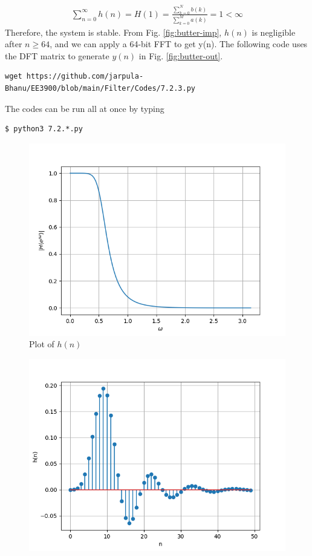 \documentclass[journal,12pt,twocolumn]{IEEEtran}
\renewcommand\thesection{\arabic{section}}
\begin{document}
\begin{enumerate}[label=\thesection.\arabic*]
\begin{align}
	\sum_{n = 0}^{\infty}h(n) = H(1) = \frac{\sum_{k = 0}^{N}b(k)}{\sum_{k = 0}^{M}a(k)} = 1 < \infty
\end{align}
Therefore, the system is stable. From
Fig. \eqref{fig:butter-imp}, $h(n)$ is negligible after $n \geq 64$, and we
can apply a 64-bit FFT to get y(n). The following code uses the DFT matrix
to generate $y(n)$ in Fig. \eqref{fig:butter-out}.
\begin{lstlisting}
wget https://github.com/jarpula-Bhanu/EE3900/blob/main/Filter/Codes/7.2.3.py
\end{lstlisting}
The codes can be run all at once by typing
\begin{lstlisting}
$ python3 7.2.*.py
\end{lstlisting}
\begin{figure}[!htb]
	\includegraphics[width=\columnwidth]{figs/7.2.1.png}
	\caption{Plot of $h(n)$}
	\label{fig:butter-imp}
\end{figure}
\begin{figure}[!htb]
	\includegraphics[width=\columnwidth]{figs/7.2.2.png}

\end{figure}
\end{enumerate}
\end{document}
